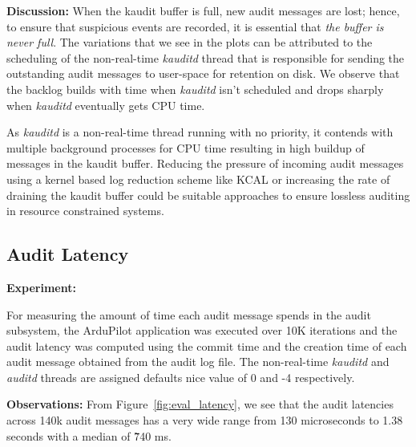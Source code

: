 \textbf{Discussion:}
When the kaudit buffer is full, new audit messages are lost; hence, to ensure that suspicious events are recorded, it is essential that \textit{the buffer is never full}.
The variations that we see in the plots can be attributed to the scheduling of the non-real-time \textit{kauditd} thread that is responsible for sending the outstanding audit messages to user-space for retention on disk. We observe that the backlog builds with time when \textit{kauditd} isn't scheduled and drops sharply when \textit{kauditd} eventually gets CPU time. 

As \textit{kauditd} is a non-real-time thread running with no priority, it contends with multiple background processes for CPU time resulting in high buildup of messages in the kaudit buffer. Reducing the pressure of incoming audit messages using a kernel based log reduction scheme like KCAL \cite{Ma2018} or increasing the rate of draining the kaudit buffer could be suitable approaches to ensure lossless auditing in resource constrained systems.

\subsection{Audit Latency}
\textbf{Experiment:}



For measuring the amount of time each audit message spends in the audit subsystem, the ArduPilot application was executed over 10K iterations and the audit latency was computed using the commit time and the creation time of each audit message obtained from the audit log file. The non-real-time \textit{kauditd} and \textit{auditd} threads are assigned defaults nice value of 0 and -4 respectively.

\textbf{Observations:} From Figure~\ref{fig:eval_latency}, we see that the audit latencies across 140k audit messages has a very wide range from 130 microseconds to 1.38 seconds with a median of \~740 ms. 


